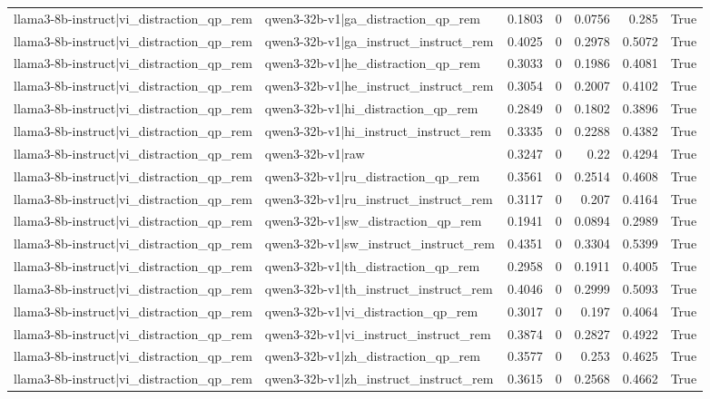 \begin{table}
\begin{tabular}{l l r r r r l}
llama3-8b-instruct|vi_distraction_qp_rem & qwen3-32b-v1|ga_distraction_qp_rem & 0.1803 & 0 & 0.0756 & 0.285 & True \\
llama3-8b-instruct|vi_distraction_qp_rem & qwen3-32b-v1|ga_instruct_instruct_rem & 0.4025 & 0 & 0.2978 & 0.5072 & True \\
llama3-8b-instruct|vi_distraction_qp_rem & qwen3-32b-v1|he_distraction_qp_rem & 0.3033 & 0 & 0.1986 & 0.4081 & True \\
llama3-8b-instruct|vi_distraction_qp_rem & qwen3-32b-v1|he_instruct_instruct_rem & 0.3054 & 0 & 0.2007 & 0.4102 & True \\
llama3-8b-instruct|vi_distraction_qp_rem & qwen3-32b-v1|hi_distraction_qp_rem & 0.2849 & 0 & 0.1802 & 0.3896 & True \\
llama3-8b-instruct|vi_distraction_qp_rem & qwen3-32b-v1|hi_instruct_instruct_rem & 0.3335 & 0 & 0.2288 & 0.4382 & True \\
llama3-8b-instruct|vi_distraction_qp_rem & qwen3-32b-v1|raw & 0.3247 & 0 & 0.22 & 0.4294 & True \\
llama3-8b-instruct|vi_distraction_qp_rem & qwen3-32b-v1|ru_distraction_qp_rem & 0.3561 & 0 & 0.2514 & 0.4608 & True \\
llama3-8b-instruct|vi_distraction_qp_rem & qwen3-32b-v1|ru_instruct_instruct_rem & 0.3117 & 0 & 0.207 & 0.4164 & True \\
llama3-8b-instruct|vi_distraction_qp_rem & qwen3-32b-v1|sw_distraction_qp_rem & 0.1941 & 0 & 0.0894 & 0.2989 & True \\
llama3-8b-instruct|vi_distraction_qp_rem & qwen3-32b-v1|sw_instruct_instruct_rem & 0.4351 & 0 & 0.3304 & 0.5399 & True \\
llama3-8b-instruct|vi_distraction_qp_rem & qwen3-32b-v1|th_distraction_qp_rem & 0.2958 & 0 & 0.1911 & 0.4005 & True \\
llama3-8b-instruct|vi_distraction_qp_rem & qwen3-32b-v1|th_instruct_instruct_rem & 0.4046 & 0 & 0.2999 & 0.5093 & True \\
llama3-8b-instruct|vi_distraction_qp_rem & qwen3-32b-v1|vi_distraction_qp_rem & 0.3017 & 0 & 0.197 & 0.4064 & True \\
llama3-8b-instruct|vi_distraction_qp_rem & qwen3-32b-v1|vi_instruct_instruct_rem & 0.3874 & 0 & 0.2827 & 0.4922 & True \\
llama3-8b-instruct|vi_distraction_qp_rem & qwen3-32b-v1|zh_distraction_qp_rem & 0.3577 & 0 & 0.253 & 0.4625 & True \\
llama3-8b-instruct|vi_distraction_qp_rem & qwen3-32b-v1|zh_instruct_instruct_rem & 0.3615 & 0 & 0.2568 & 0.4662 & True \\

\end{tabular}
\end{table}
